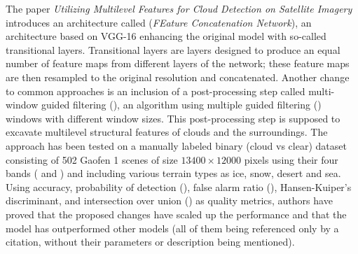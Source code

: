 The paper \textit{Utilizing Multilevel Features for Cloud Detection on Satellite Imagery} introduces an architecture called  (\textit{FEature Concatenation Network}), an architecture based on VGG-16 \cite{vgg} enhancing the original model with so-called transitional layers. Transitional layers are layers designed to produce an equal number of feature maps from different layers of the network; these feature maps are then resampled to the original resolution and concatenated. Another change to common approaches is an inclusion of a post-processing step called multi-window guided filtering (), an algorithm using multiple guided filtering () \cite{gf} windows with different window sizes. This post-processing step is supposed to excavate multilevel structural features of clouds and the surroundings. The approach has been tested on a manually labeled binary (cloud vs clear) dataset consisting of 502 Gaofen 1 scenes of size $13400 \times 12000$ pixels using their four bands ( and ) and including various terrain types as ice, snow, desert and sea. Using accuracy, probability of detection (), false alarm ratio (), Hansen-Kuiper's discriminant, and intersection over union () as quality metrics, authors have proved that the proposed changes have scaled up the performance and that the model has outperformed other models (all of them being referenced only by a citation, without their parameters or description being mentioned).

